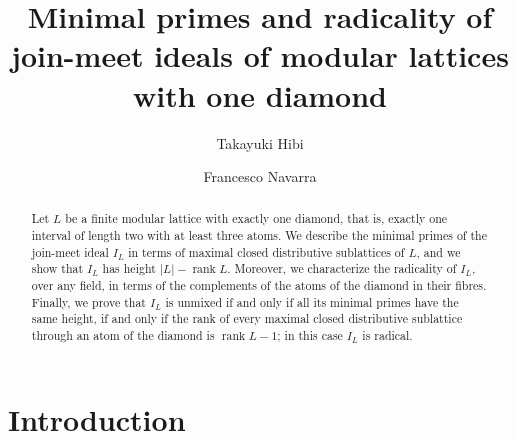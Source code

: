 \documentclass{amsart}
\title[Join-meet ideals of modular lattices with one diamond]{Minimal primes and radicality of join-meet ideals of modular lattices with one diamond}
\author[T.~Hibi]{Takayuki Hibi}
\author[F. Navarra]{Francesco Navarra}
\theoremstyle{definition}
\DeclareMathOperator{\rk}{rank}
\begin{document}
\begin{abstract}
Let $L$ be a finite modular lattice with exactly one diamond, that is, exactly one interval of length two with at least three atoms. We describe the minimal primes of the join-meet ideal $I_L$ in terms of maximal closed distributive sublattices of $L$, and we show that $I_L$ has height $|L|-\rk L$. Moreover, we characterize the radicality of $I_L$, over any field, in terms of the complements of the atoms of the diamond in their fibres. Finally, we prove that $I_L$ is unmixed if and only if all its minimal primes have the same height, if and only if the rank of every maximal closed distributive sublattice through an atom of the diamond is $\rk L-1$; in this case $I_L$ is radical.
\end{abstract}

\maketitle

\section{Introduction}
\end{document}
